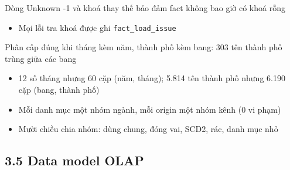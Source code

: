 \begin{frame}{Dòng Unknown -1 và khoá thay thế bảo đảm fact không bao giờ có khoá rỗng}
\begin{itemize}
  \item Mọi lỗi tra khoá được ghi \texttt{fact\_\allowbreak{}load\_\allowbreak{}issue}
\end{itemize}

\end{frame}

\begin{frame}{Phân cấp đúng khi tháng kèm năm, thành phố kèm bang: 303 tên thành phố trùng giữa các bang}
\begin{itemize}
  \item 12 số tháng nhưng 60 cặp (năm, tháng); 5.814 tên thành phố nhưng 6.190 cặp (bang, thành phố)
  \item Mỗi danh mục một nhóm ngành, mỗi origin một nhóm kênh (0 vi phạm)
  \item Mười chiều chia nhóm: dùng chung, đóng vai, SCD2, rác, danh mục nhỏ
\end{itemize}

\end{frame}

\subsection{3.5 Data model OLAP}

